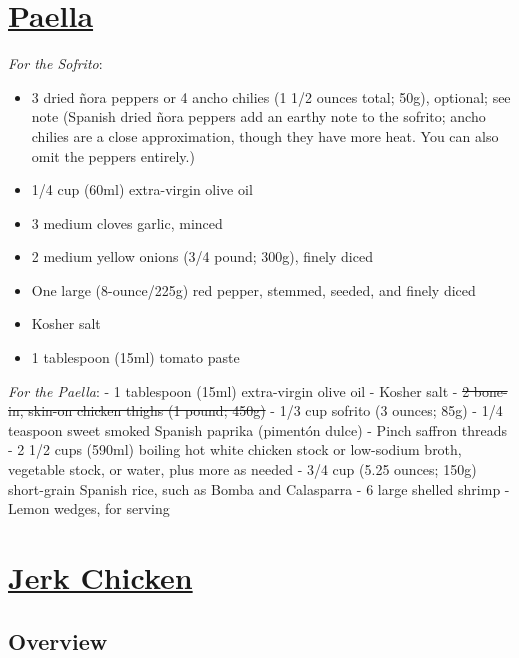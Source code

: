 \documentclass[
]{article}
\providecommand{\tightlist}{%
  \setlength{\itemsep}{0pt}\setlength{\parskip}{0pt}}
\begin{document}
\hypertarget{paella}{%
\section{\texorpdfstring{\href{https://www.seriouseats.com/recipes/2019/09/stovetop-paella-mixta-for-two-with-chicken-and-shrimp.html}{Paella}}{Paella}}\label{paella}}

\emph{For the Sofrito}:

\begin{itemize}
\tightlist
\item
  3 dried ñora peppers or 4 ancho chilies (1 1/2 ounces total; 50g), optional; see note (Spanish dried ñora peppers add an earthy note to the sofrito; ancho chilies are a close approximation, though they have more heat. You can also omit the peppers entirely.)
\item
  1/4 cup (60ml) extra-virgin olive oil
\item
  3 medium cloves garlic, minced
\item
  2 medium yellow onions (3/4 pound; 300g), finely diced
\item
  One large (8-ounce/225g) red pepper, stemmed, seeded, and finely diced
\item
  Kosher salt
\item
  1 tablespoon (15ml) tomato paste
\end{itemize}

\emph{For the Paella}:
- 1 tablespoon (15ml) extra-virgin olive oil
- Kosher salt
- \sout{2 bone-in, skin-on chicken thighs (1 pound; 450g)}
- 1/3 cup sofrito (3 ounces; 85g)
- 1/4 teaspoon sweet smoked Spanish paprika (pimentón dulce)
- Pinch saffron threads
- 2 1/2 cups (590ml) boiling hot white chicken stock or low-sodium broth, vegetable stock, or water, plus more as needed
- 3/4 cup (5.25 ounces; 150g) short-grain Spanish rice, such as Bomba and Calasparra
- 6 large shelled shrimp
- Lemon wedges, for serving

\hypertarget{jerk-chicken}{%
\section{\texorpdfstring{\href{https://www.seriouseats.com/recipes/2013/08/jerk-chicken.html}{Jerk Chicken}}{Jerk Chicken}}\label{jerk-chicken}}

\hypertarget{overview}{%
\subsection{Overview}\label{overview}}
\end{document}
